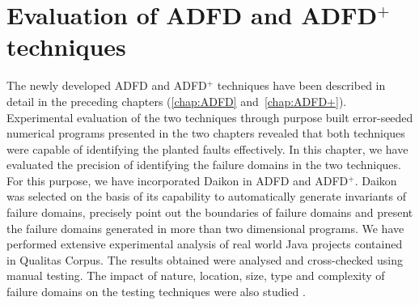 
\chapter{Evaluation of ADFD and ADFD$^+$ techniques}
\label{chap:Evaluation}
	
The newly developed ADFD and ADFD$^+$ techniques have been described in detail in the preceding chapters (\ref{chap:ADFD} and~\ref{chap:ADFD+}). Experimental evaluation of the two techniques through purpose built error-seeded numerical programs presented in the two chapters revealed that both techniques were capable of identifying the planted faults effectively. In this chapter, we have evaluated the precision of identifying the failure domains in the two techniques. For this purpose, we have incorporated Daikon in ADFD and ADFD$^+$. Daikon was selected on the basis of its capability to automatically generate invariants of failure domains, precisely point out the boundaries of failure domains and present the failure domains generated in more than two dimensional programs. We have performed extensive experimental analysis of real world Java projects contained in Qualitas Corpus. The results obtained were analysed and cross-checked using manual testing. The impact of nature, location, size, type and complexity of failure domains on the testing techniques were also studied \cite{ahmad2014evaluation}. 




  





